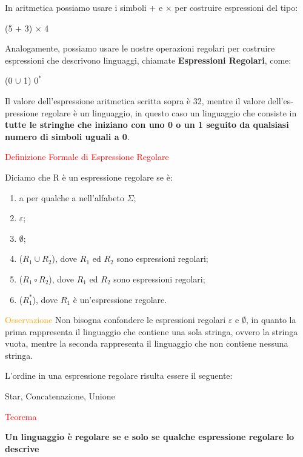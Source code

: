 \documentclass{article}
\begin{document}
In aritmetica possiamo usare i simboli + e $\times$ per costruire espressioni
del tipo:

\begin{center}
    (5 + 3) $\times$ 4
\end{center}

Analogamente, possiamo usare le nostre operazioni regolari per costruire
espressioni che descrivono linguaggi, chiamate \textbf{Espressioni Regolari},
come:

\begin{center}
    (0 $\cup$ 1) $0^*$
\end{center}

Il valore dell'espressione aritmetica scritta sopra è 32, mentre il valore
dell'es-pressione regolare è un linguaggio, in questo caso un linguaggio che
consiste in \textbf{tutte le stringhe che iniziano con uno 0 o un 1 seguito da
qualsiasi numero di simboli uguali a 0}.

\textcolor{red}{Definizione Formale di Espressione Regolare}

\noindent Diciamo che R è un espressione regolare se è:
\begin{enumerate}
    \item a per qualche a nell'alfabeto $\Sigma$;
    \item $\varepsilon$;
    \item $\emptyset$;
    \item ($R_1 \cup R_2$), dove $R_1$ ed $R_2$ sono espressioni regolari;
    \item ($R_1 \circ R_2$), dove $R_1$ ed $R_2$ sono espressioni regolari;
    \item ($R_1^*$), dove $R_1$ è un'espressione regolare.
\end{enumerate}

\textcolor{orange}{Osservazione} Non bisogna confondere le espressioni regolari
$\varepsilon$ e $\emptyset$, in quanto la prima rappresenta il linguaggio che
contiene una sola stringa, ovvero la stringa vuota, mentre la seconda
rappresenta il linguaggio che non contiene nessuna stringa.

\noindent L'ordine in una espressione regolare risulta essere il seguente:
\begin{center}
    Star, Concatenazione, Unione
\end{center}

\begin{center}
    \textcolor{red}{Teorema}
    
    \textbf{Un linguaggio è regolare se e solo se qualche espressione regolare lo descrive}
\end{center}
\end{document}
